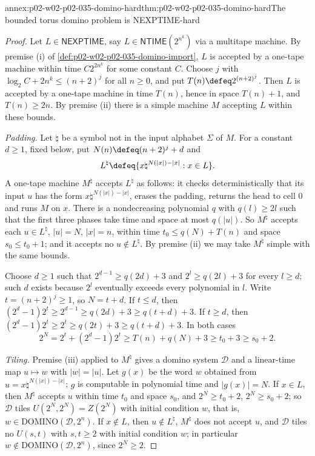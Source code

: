 \begin{annexitem}{annex:p02-w02-p02-035-domino-hard}{thm:p02-w02-p02-035-domino-hard}{The bounded torus domino problem is NEXPTIME-hard}
\begin{proof}
Let \(L\in\mathsf{NEXPTIME}\), say \(L\in\mathsf{NTIME}(2^{n^k})\) via a
multitape machine.  By premise (i) of
\cref{def:p02-w02-p02-035-domino-import}, \(L\) is accepted by a one-tape
machine within time \(C2^{2n^k}\) for some constant \(C\).  Choose \(j\) with
\(\log_2C+2n^k\leq(n+2)^j\) for all \(n\geq0\), and put
\(T(n)\defeq2^{(n+2)^j}\).  Then \(L\) is accepted by a one-tape machine in
time \(T(n)\), hence in space \(T(n)+1\), and \(T(n)\geq2n\).  By premise
(ii) there is a simple machine \(M\) accepting \(L\) within these bounds.

\emph{Padding.}  Let \(\natural\) be a symbol not in the input alphabet
\(\Sigma\) of \(M\).  For a constant \(d\geq1\), fixed below, put
\(N(n)\defeq(n+2)^j+d\) and
\[
 L^\natural\defeq\{x\natural^{N(\lvert x\rvert)-\lvert x\rvert}:x\in L\}.
\]
A one-tape machine \(M^\natural\) accepts \(L^\natural\) as follows: it checks
deterministically that its input \(u\) has the form
\(x\natural^{N(\lvert x\rvert)-\lvert x\rvert}\), erases the padding, returns
the head to cell \(0\) and runs \(M\) on \(x\).  There is a nondecreasing
polynomial \(q\) with \(q(l)\geq2l\) such that the first three phases take
time and space at most \(q(\lvert u\rvert)\).  So \(M^\natural\) accepts each
\(u\in L^\natural\), \(\lvert u\rvert=N\), \(\lvert x\rvert=n\), within time
\(t_0\leq q(N)+T(n)\) and space \(s_0\leq t_0+1\); and it accepts no
\(u\notin L^\natural\).  By premise (ii) we may take \(M^\natural\) simple
with the same bounds.

Choose \(d\geq1\) such that \(2^{d-1}\geq q(2d)+3\) and \(2^{l}\geq q(2l)+3\)
for every \(l\geq d\); such \(d\) exists because \(2^l\) eventually exceeds
every polynomial in \(l\).  Write \(t=(n+2)^j\geq1\), so \(N=t+d\).  If
\(t\leq d\), then \((2^d-1)2^t\geq2^{d-1}\geq q(2d)+3\geq q(t+d)+3\).  If
\(t\geq d\), then \((2^d-1)2^t\geq2^t\geq q(2t)+3\geq q(t+d)+3\).  In both
cases
\[
 2^N=2^t+(2^d-1)2^t\geq T(n)+q(N)+3\geq t_0+3\geq s_0+2 .
\]

\emph{Tiling.}  Premise (iii) applied to \(M^\natural\) gives a domino system
\(\mathcal D\) and a linear-time map \(u\mapsto w\) with
\(\lvert w\rvert=\lvert u\rvert\).  Let
\(g(x)\) be the word \(w\) obtained from
\(u=x\natural^{N(\lvert x\rvert)-\lvert x\rvert}\); \(g\) is computable in
polynomial time and \(\lvert g(x)\rvert=N\).  If \(x\in L\), then
\(M^\natural\) accepts \(u\) within time \(t_0\) and space \(s_0\), and
\(2^N\geq t_0+2\), \(2^N\geq s_0+2\); so \(\mathcal D\) tiles
\(U(2^N,2^N)=Z(2^N)\) with initial condition \(w\), that is,
\(w\in\mathrm{DOMINO}(\mathcal D,2^n)\).  If \(x\notin L\), then \(u\notin
L^\natural\), \(M^\natural\) does not accept \(u\), and \(\mathcal D\) tiles no
\(U(s,t)\) with \(s,t\geq2\) with initial condition \(w\); in particular
\(w\notin\mathrm{DOMINO}(\mathcal D,2^n)\), since \(2^N\geq2\).
\end{proof}
\end{annexitem}

